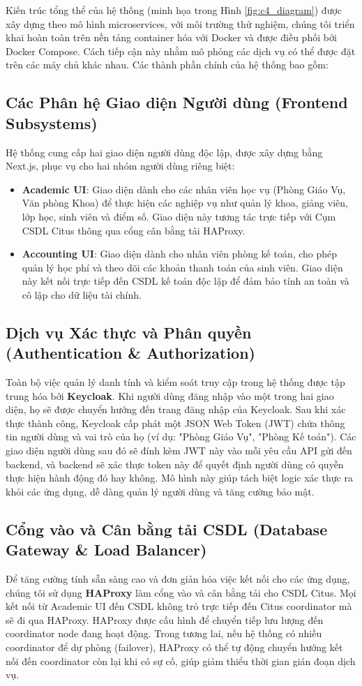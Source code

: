 \documentclass[conference]{IEEEtran}
\begin{document}
Kiến trúc tổng thể của hệ thống (minh họa trong Hình \ref{fig:c4_diagram}) được xây dựng theo mô hình microservices, với môi trường thử nghiệm, chúng tôi triển khai hoàn toàn trên nền tảng container hóa với Docker và được điều phối bởi Docker Compose. Cách tiếp cận này nhằm mô phỏng các dịch vụ có thể được đặt trên các máy chủ khác nhau. Các thành phần chính của hệ thống bao gồm:

\subsection{Các Phân hệ Giao diện Người dùng (Frontend Subsystems)}
Hệ thống cung cấp hai giao diện người dùng độc lập, được xây dựng bằng Next.js, phục vụ cho hai nhóm người dùng riêng biệt:
\begin{itemize}
    \item \textbf{Academic UI}: Giao diện dành cho các nhân viên học vụ (Phòng Giáo Vụ, Văn phòng Khoa) để thực hiện các nghiệp vụ như quản lý khoa, giảng viên, lớp học, sinh viên và điểm số. Giao diện này tương tác trực tiếp với Cụm CSDL Citus thông qua cổng cân bằng tải HAProxy.
    \item \textbf{Accounting UI}: Giao diện dành cho nhân viên phòng kế toán, cho phép quản lý học phí và theo dõi các khoản thanh toán của sinh viên. Giao diện này kết nối trực tiếp đến CSDL kế toán độc lập để đảm bảo tính an toàn và cô lập cho dữ liệu tài chính.
\end{itemize}

\subsection{Dịch vụ Xác thực và Phân quyền (Authentication \& Authorization)}
Toàn bộ việc quản lý danh tính và kiểm soát truy cập trong hệ thống được tập trung hóa bởi \textbf{Keycloak}. Khi người dùng đăng nhập vào một trong hai giao diện, họ sẽ được chuyển hướng đến trang đăng nhập của Keycloak. Sau khi xác thực thành công, Keycloak cấp phát một JSON Web Token (JWT) chứa thông tin người dùng và vai trò của họ (ví dụ: "Phòng Giáo Vụ", "Phòng Kế toán"). Các giao diện người dùng sau đó sẽ đính kèm JWT này vào mỗi yêu cầu API gửi đến backend, và backend sẽ xác thực token này để quyết định người dùng có quyền thực hiện hành động đó hay không. Mô hình này giúp tách biệt logic xác thực ra khỏi các ứng dụng, dễ dàng quản lý người dùng và tăng cường bảo mật.

\subsection{Cổng vào và Cân bằng tải CSDL (Database Gateway \& Load Balancer)}
Để tăng cường tính sẵn sàng cao và đơn giản hóa việc kết nối cho các ứng dụng, chúng tôi sử dụng \textbf{HAProxy} làm cổng vào và cân bằng tải cho CSDL Citus. Mọi kết nối từ Academic UI đến CSDL không trỏ trực tiếp đến Citus coordinator mà sẽ đi qua HAProxy. HAProxy được cấu hình để chuyển tiếp lưu lượng đến coordinator node đang hoạt động. Trong tương lai, nếu hệ thống có nhiều coordinator để dự phòng (failover), HAProxy có thể tự động chuyển hướng kết nối đến coordinator còn lại khi có sự cố, giúp giảm thiểu thời gian gián đoạn dịch vụ.
\end{document}
